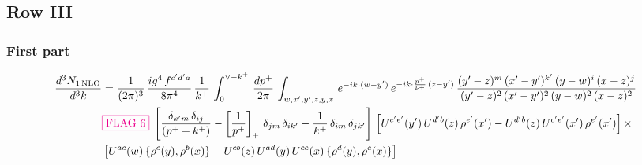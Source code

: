 \documentclass[9pt]{article}
\numberwithin{equation}{section}
\begin{document}
 \subsection{Row III}
\subsubsection{First part}
\begin{align}
     \frac{d^{3}N_{1\,\rm NLO}}{d^{3}k} & = \frac{1}{(2\pi)^{3}}\, \frac{ig^{4}\,f^{c'd'a}}{8\pi^{4}}\, \frac{1}{k^{+}}\,\int_{0}^{\vee-k^{+}}\,  \frac{dp^{+}}{2\pi}\, \int_{w,x',y',z,y,x}\, e^{-ik\cdot (w-y')}\, e^{-ik\cdot \frac{p^{+}}{k^{+}}\,(z-y')}\,\frac{(y'-z)^{m}\,(x'-y')^{k'}\,(y-w)^{i}\,(x-z)^{j}}{(y'-z)^{2}\,(x'-y')^{2}\,(y-w)^{2}\,(x-z)^{2}}\notag \\ & {\color{magenta}\fbox{FLAG 6}}\;\left[\frac{\delta_{k'm}\,\delta_{ij}}{(p^{+}+k^{+})}-\left[\frac{1}{p^{+}}\right]_{+}\,\delta_{jm}\,\delta_{ik'}-\frac{1}{k^{+}}\, \delta_{im}\, \delta_{jk'}\right]\, \left[U^{c'e'}(y')\,U^{d'b}(z)\,\rho^{e'}(x')-U^{d'b}(z)\,U^{c'e'}(x')\,\rho^{e'}(x')\right]\times\notag \\ &  \left[U^{ac}(w)\, \{\rho^{c}(y),\rho^{b}(x)\}-U^{cb}(z)\,U^{ad}(y)\,U^{ce}(x)\,\{\rho^{d}(y),\rho^{e}(x)\}\right]

\end{align}
\end{document}
